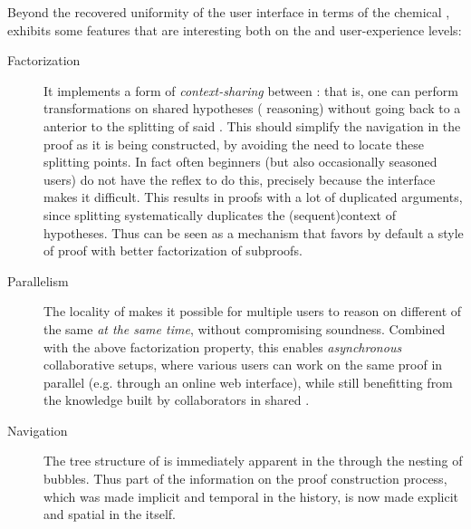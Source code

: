 \begin{scope}
Beyond the recovered uniformity of the user interface in terms of the chemical
,  exhibits some features that are interesting both on the
 and user-experience levels:
\begin{description}
  \item[Factorization] It implements a form of \emph{context-sharing}
    between : that is, one can perform transformations on shared
    hypotheses ( reasoning) without going back to a 
    anterior to the splitting of said . This should simplify the
    navigation in the proof as it is being constructed, by avoiding the need to
    locate these splitting points. In fact often beginners (but also
    occasionally seasoned users) do not have the reflex to do this, precisely
    because the interface makes it difficult. This results in proofs with a lot
    of duplicated arguments, since splitting  systematically
    duplicates the \kl(sequent){context} of hypotheses. Thus  can be
    seen as a mechanism that favors by default a style of proof with better
    factorization of subproofs.
  
  \item[Parallelism]
    The locality of  makes it possible for multiple users to
    reason on different  of the same  \emph{at the
    same time}, without compromising soundness. Combined with the above
    factorization property, this enables \emph{asynchronous} collaborative
    setups, where various users can work on the same proof in parallel (e.g.
    through an online web interface), while still benefitting from the knowledge
    built by collaborators in shared .

  \item[Navigation] The tree structure of  is immediately
    apparent in the  through the nesting of bubbles. Thus part of the
    information on the proof construction process, which was made implicit and
    temporal in the  history, is now made explicit and spatial in the
     itself.
    

\end{description}
\end{scope}
